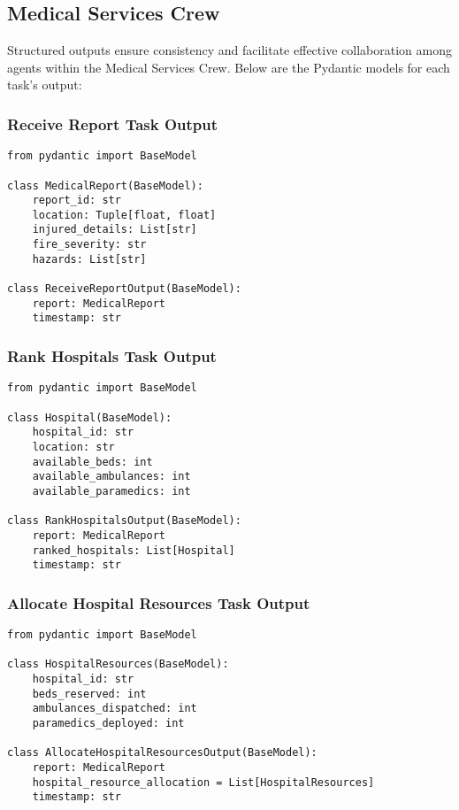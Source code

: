 \subsection{Medical Services Crew}

Structured outputs ensure consistency and facilitate effective collaboration among agents within the Medical Services Crew. Below are the Pydantic models for each task's output:

\subsubsection{Receive Report Task Output}
\begin{lstlisting}[caption={Pydantic model for Receive Report Task Output}]
from pydantic import BaseModel

class MedicalReport(BaseModel): 
    report_id: str
    location: Tuple[float, float] 
    injured_details: List[str] 
    fire_severity: str
    hazards: List[str]

class ReceiveReportOutput(BaseModel):
    report: MedicalReport
    timestamp: str
\end{lstlisting}

\subsubsection{Rank Hospitals Task Output}
\begin{lstlisting}[caption={Pydantic model for Rank Hospitals Task Output}]
from pydantic import BaseModel

class Hospital(BaseModel):
    hospital_id: str
    location: str
    available_beds: int
    available_ambulances: int
    available_paramedics: int

class RankHospitalsOutput(BaseModel):
    report: MedicalReport
    ranked_hospitals: List[Hospital]
    timestamp: str
\end{lstlisting}

\subsubsection{Allocate Hospital Resources Task Output}
\begin{lstlisting}[caption={Pydantic model for Allocate Hospital Resources Task Output}]
from pydantic import BaseModel

class HospitalResources(BaseModel):
    hospital_id: str
    beds_reserved: int
    ambulances_dispatched: int
    paramedics_deployed: int

class AllocateHospitalResourcesOutput(BaseModel):
    report: MedicalReport
    hospital_resource_allocation = List[HospitalResources]
    timestamp: str
\end{lstlisting}

